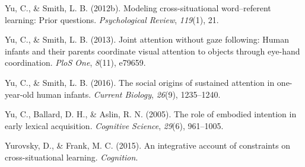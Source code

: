 \documentclass[english,man]{apa6}
\theoremstyle{definition}
\theoremstyle{definition}
\theoremstyle{definition}
\theoremstyle{remark}
\begin{document}
\hypertarget{ref-yu2012modeling}{}
Yu, C., \& Smith, L. B. (2012b). Modeling cross-situational
word--referent learning: Prior questions. \emph{Psychological Review},
\emph{119}(1), 21.

\hypertarget{ref-yu2013joint}{}
Yu, C., \& Smith, L. B. (2013). Joint attention without gaze following:
Human infants and their parents coordinate visual attention to objects
through eye-hand coordination. \emph{PloS One}, \emph{8}(11), e79659.

\hypertarget{ref-yu2016social}{}
Yu, C., \& Smith, L. B. (2016). The social origins of sustained
attention in one-year-old human infants. \emph{Current Biology},
\emph{26}(9), 1235--1240.

\hypertarget{ref-yu2005role}{}
Yu, C., Ballard, D. H., \& Aslin, R. N. (2005). The role of embodied
intention in early lexical acquisition. \emph{Cognitive Science},
\emph{29}(6), 961--1005.

\hypertarget{ref-yurovsky2014algorithmic}{}
Yurovsky, D., \& Frank, M. C. (2015). An integrative account of
constraints on cross-situational learning. \emph{Cognition}.
\end{document}
